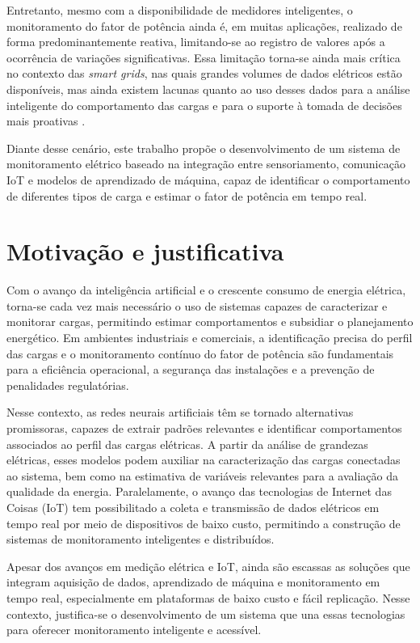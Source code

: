 Entretanto, mesmo com a disponibilidade de medidores inteligentes, o monitoramento do fator de potência ainda é, em muitas aplicações, realizado de forma predominantemente reativa, limitando-se ao registro de valores após a ocorrência de variações significativas. Essa limitação torna-se ainda mais crítica no contexto das \textit{smart grids}, nas quais grandes volumes de dados elétricos estão disponíveis, mas ainda existem lacunas quanto ao uso desses dados para a análise inteligente do comportamento das cargas e para o suporte à tomada de decisões mais proativas \cite{MedidoresInteligentes}.

\newpage
Diante desse cenário, este trabalho propõe o desenvolvimento de um sistema de monitoramento elétrico baseado na integração entre sensoriamento, comunicação IoT e modelos de aprendizado de máquina, capaz de identificar o comportamento de diferentes tipos de carga e estimar o fator de potência em tempo real.

\section{Motivação e justificativa}
Com o avanço da inteligência artificial e o crescente consumo de energia elétrica, torna-se cada vez mais necessário o uso de sistemas capazes de caracterizar e monitorar cargas, permitindo estimar comportamentos e subsidiar o planejamento energético. Em ambientes industriais e comerciais, a identificação precisa do perfil das cargas e o monitoramento contínuo do fator de potência são fundamentais para a eficiência operacional, a segurança das instalações e a prevenção de penalidades regulatórias.

Nesse contexto, as redes neurais artificiais têm se tornado alternativas promissoras, capazes de extrair padrões relevantes e identificar comportamentos associados ao perfil das cargas elétricas. A partir da análise de grandezas elétricas, esses modelos podem auxiliar na caracterização das cargas conectadas ao sistema, bem como na estimativa de variáveis relevantes para a avaliação da qualidade da energia. Paralelamente, o avanço das tecnologias de Internet das Coisas (IoT) tem possibilitado a coleta e transmissão de dados elétricos em tempo real por meio de dispositivos de baixo custo, permitindo a construção de sistemas de monitoramento inteligentes e distribuídos.

Apesar dos avanços em medição elétrica e IoT, ainda são escassas as soluções que integram aquisição de dados, aprendizado de máquina e monitoramento em tempo real, especialmente em plataformas de baixo custo e fácil replicação. Nesse contexto, justifica-se o desenvolvimento de um sistema que una essas tecnologias para oferecer monitoramento inteligente e acessível.

